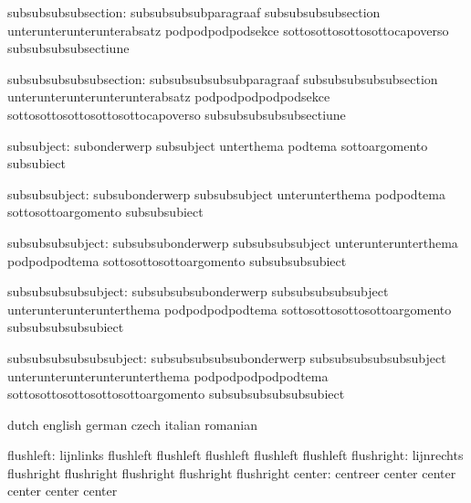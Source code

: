    subsubsubsubsection: subsubsubsubparagraaf                    subsubsubsubsection
                        unterunterunterunterabsatz               podpodpodpodsekce
                        sottosottosottosottocapoverso            subsubsubsubsectiune

subsubsubsubsubsection: subsubsubsubsubparagraaf                 subsubsubsubsubsection
                        unterunterunterunterunterabsatz          podpodpodpodpodsekce
                        sottosottosottosottosottocapoverso       subsubsubsubsubsectiune

            subsubject: subonderwerp                             subsubject
                        unterthema                               podtema
                        sottoargomento                           subsubiect

         subsubsubject: subsubonderwerp                          subsubsubject
                        unterunterthema                          podpodtema
                        sottosottoargomento                      subsubsubiect

      subsubsubsubject: subsubsubonderwerp                       subsubsubsubject
                        unterunterunterthema                     podpodpodtema
                        sottosottosottoargomento                 subsubsubsubiect

   subsubsubsubsubject: subsubsubsubonderwerp                    subsubsubsubsubject
                        unterunterunterunterthema                podpodpodpodtema
                        sottosottosottosottoargomento            subsubsubsubsubiect

subsubsubsubsubsubject: subsubsubsubsubonderwerp                 subsubsubsubsubsubject
                        unterunterunterunterunterthema           podpodpodpodpodtema
                        sottosottosottosottosottoargomento       subsubsubsubsubsubiect

\stopvariables


\startvariables            dutch                     english
                           german                    czech
                           italian                   romanian

                flushleft: lijnlinks                 flushleft
                           flushleft                 flushleft
                           flushleft                 flushleft
               flushright: lijnrechts                flushright
                           flushright                flushright
                           flushright                flushright
                   center: centreer                  center
                           center                    center
                           center                    center

